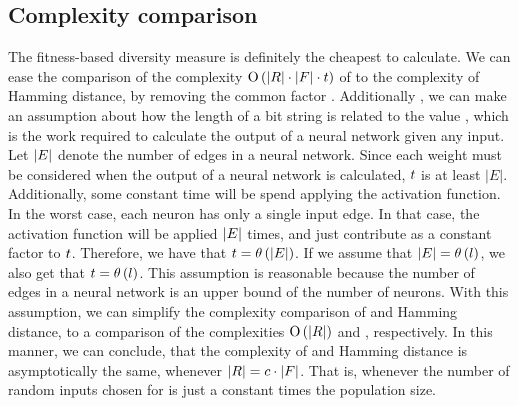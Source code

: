 \subsection{Complexity comparison}
The fitness-based diversity measure is definitely the cheapest to calculate. We can ease the comparison of the complexity $\operatorname{O}\left(\lvert R\rvert\cdot\lvert F\rvert\cdot t\right)$ of \dia{} to the complexity \bigO{\indsetl^2 \cdot \bitstringl} of Hamming distance, by removing the common factor \indsetl. Additionally , we can make an assumption about how the length of a bit string \bitstringl{} is related to the value \timet, which is the work required to calculate the output of a neural network given any input. Let $\lvert E\rvert$ denote the number of edges in a neural network. Since each weight must be considered when the output of a neural network is calculated, $t${} is at least $|E|$. Additionally, some constant time will be spend applying the activation function. In the worst case, each neuron has only a single input edge. In that case, the activation function will be applied $\lvert E\rvert$ times, and just contribute as a constant factor to $t$. Therefore, we have that $t = \theta\left(\lvert E\rvert\right)$. If we assume that $\lvert E\rvert = \theta\left(l\right)$, we also get that $t = \theta\left(l\right)$. This assumption is reasonable because the number of edges in a neural network is an upper bound of the number of neurons. With this assumption, we can simplify the complexity comparison of \dia{} and Hamming distance, to a comparison of the complexities $\operatorname{O}\left(\lvert R\rvert\right)$ and \bigO{\indsetl}, respectively. In this manner, we can conclude, that the complexity of \dia{} and Hamming distance is asymptotically the same, whenever $\lvert R\rvert = c \cdot \lvert F\rvert$. That is, whenever the number of random inputs chosen for \dia{} is just a constant times the population size.
